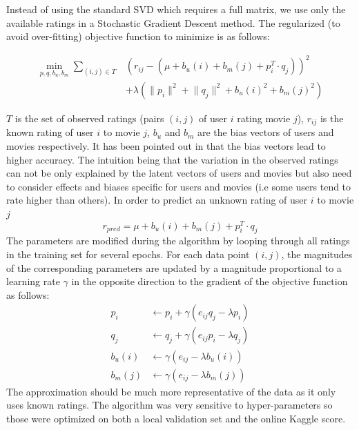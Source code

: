 \documentclass[10pt,conference,compsocconf]{IEEEtran}
\begin{document}
	Instead of using the standard SVD which requires a full matrix, we use only the available ratings in a Stochastic Gradient Descent method. The regularized (to avoid over-fitting) objective function to minimize is as follows:
	
	\begin{equation}
	\begin{split}
	\min_{p,q,b_u,b_m} \sum_{(i,j) \in T} &(r_{ij} - (\mu + b_u(i) + b_m(j) + p_i^T \cdot q_j))^2 \\ &+ \lambda(\lVert p_i \rVert^2 + \lVert q_j \rVert^2 + b_u(i)^2 + b_m(j)^2) 
	\end{split}
	\end{equation}
	
	$T$ is the set of observed ratings (pairs $(i,j)$ of user $i$ rating movie $j$), $r_{ij}$ is the known rating of user $i$ to movie $j$, $b_u$ and $b_m$ are the bias vectors of users and movies respectively. It has been pointed out in \cite{Koren09matrixfactorization} that the bias vectors lead to higher accuracy. The intuition being that the variation in the observed ratings can not be only explained by the latent vectors of users and movies but also need to consider effects and biases specific for users and movies (i.e some users tend to rate higher than others). In order to predict an unknown rating of user $i$ to movie $j$
	\begin{equation}
	r_{pred} = \mu + b_u(i) + b_m(j) + p_i^T\cdot q_j
	\end{equation}
	The parameters are modified during the algorithm by looping through all ratings in the training set for several epochs. For each data point $(i,j)$, the magnitudes of the corresponding parameters are updated by a magnitude proportional to a learning rate $\gamma$ in the opposite direction to the gradient of the objective function as follows:
	\begin{equation}
	\begin{split}
	p_i &\leftarrow p_i + \gamma(e_{ij}q_j - \lambda p_i) \\
	q_j &\leftarrow q_j + \gamma(e_{ij}p_i - \lambda q_j) \\
	b_u(i) &\leftarrow \gamma(e_{ij} - \lambda b_u(i)) \\
	b_m(j) &\leftarrow \gamma(e_{ij} - \lambda b_m(j)) 
	\end{split}
	\end{equation}
	The approximation should be much more representative of the data as it only uses known ratings. The algorithm was very sensitive to hyper-parameters so those were optimized on both a local validation set and the online Kaggle score.
	
\end{document}
